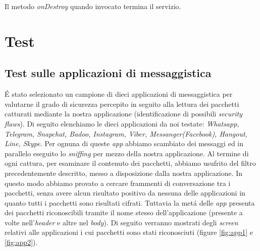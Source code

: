 \documentclass[12pt]{article} %
\begin{document}
Il metodo \textit{onDestroy} quando invocato termina il servizio.

\section{Test}

\subsection{Test sulle applicazioni di messaggistica}
\'E stato selezionato un campione di dieci applicazioni di messaggistica per valutarne il grado di sicurezza percepito in seguito alla lettura dei pacchetti catturati mediante la nostra applicazione (identificazione di possibili \textit{security flaws}). Di seguito elenchiamo le dieci applicazioni da noi testate: \textit{Whatsapp, Telegram, Snapchat, Badoo, Instagram, Viber, Messanger(Facebook), Hangout, Line, Skype}.
Per ognuna di queste \textit{app} abbiamo scambiato dei messaggi ed in parallelo eseguito lo \textit{sniffing} per mezzo della nostra applicazione. Al termine di ogni cattura, per esaminare il contenuto dei pacchetti, abbiamo usufrito del filtro precedentemente descritto, messo a disposizione dalla nostra applicazione. In questo modo abbiamo provato a cercare frammenti di conversazione tra i pacchetti, senza avere alcun risultato positivo da nessuna delle applicazioni in quanto tutti i pacchetti sono risultati cifrati. Tuttavia la met\'a delle \textit{app} presenta dei pacchetti riconoscibili tramite il nome stesso dell'applicazione (presente a volte nell'\textit{header} e altre nel \textit{body}).
Di seguito verranno mostrati degli \textit{screen} relativi alle applicazioni i cui pacchetti sono stati riconosciuti (figure \ref{fig:app1} e \ref{fig:app2}). 
\end{document}
